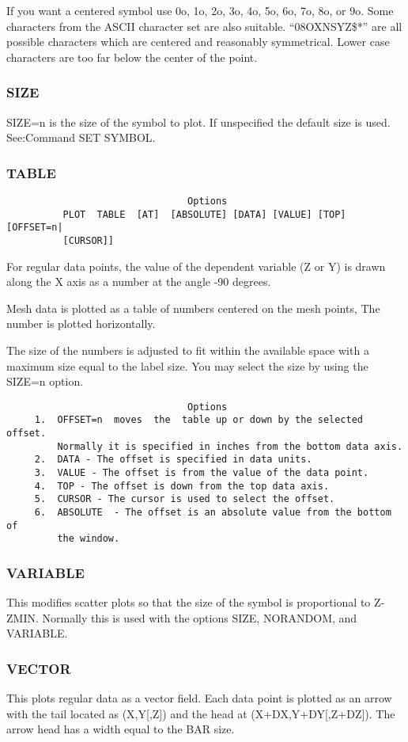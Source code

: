If  you  want a centered symbol use 0o, 1o, 2o, 3o, 4o, 5o, 6o, 7o, 8o,
or 9o.  Some characters from the ASCII character set are also suitable.
``08OXNSYZ\$*''  are  all  possible  characters  which  are  centered  and
reasonably symmetrical.  Lower case characters are too  far  below  the
center of the point.  
\subsubsection{SIZE}
SIZE=n  is  the size of the symbol to plot.  If unspecified the default
size is used.  See:Command SET SYMBOL.  
\subsubsection{TABLE}
\begin{verbatim}
                                Options
          PLOT  TABLE  [AT]  [ABSOLUTE] [DATA] [VALUE] [TOP] [OFFSET=n|
          [CURSOR]] 
\end{verbatim}
For  regular  data  points,  the value of the dependent variable (Z or Y) 
is drawn along the X axis as a number at the angle -90 degrees.  

Mesh data is plotted as a table of numbers centered on the mesh points,
The number is plotted horizontally.  

The  size  of the numbers is adjusted to fit within the available space
with a maximum size equal to the label size.  You may select  the  size
by using the SIZE=n option.  
\begin{verbatim}
                                Options
     1.  OFFSET=n  moves  the  table up or down by the selected offset.
         Normally it is specified in inches from the bottom data axis. 
     2.  DATA - The offset is specified in data units.  
     3.  VALUE - The offset is from the value of the data point.  
     4.  TOP - The offset is down from the top data axis.  
     5.  CURSOR - The cursor is used to select the offset.  
     6.  ABSOLUTE  - The offset is an absolute value from the bottom of
         the window.  
\end{verbatim}
\subsubsection{VARIABLE}
This  modifies  scatter  plots  so  that  the  size  of  the  symbol is
proportional to Z-ZMIN.  Normally this is used with the  options  SIZE,
NORANDOM, and VARIABLE.  
\subsubsection{VECTOR}
This  plots regular data as a vector field.  Each data point is plotted
as an arrow with  the  tail  located  as  (X,Y[,Z])  and  the  head  at
(X+DX,Y+DY[,Z+DZ]).  The arrow head has a width equal to the BAR size. 

